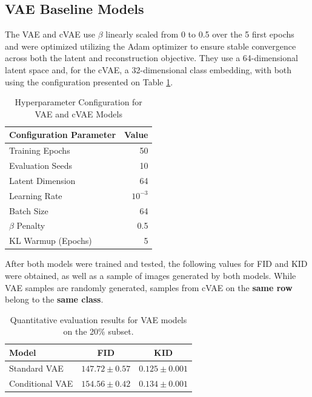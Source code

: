 \documentclass[runningheads]{llncs}
\begin{document}
\subsection{VAE Baseline Models}

The VAE and cVAE use $\beta$ linearly scaled from 0 to 0.5 over the 5 first epochs and were optimized utilizing the Adam optimizer to ensure stable convergence across both the latent and reconstruction objective. They use a 64-dimensional latent space and, for the cVAE, a 32-dimensional class embedding, with both using the configuration presented on Table \ref{tab:vae_hyperparams}.

\begin{table}[H]
\centering
\caption{Hyperparameter Configuration for VAE and cVAE Models}
\label{tab:vae_hyperparams}
\begin{tabular}{lr}
\hline
\textbf{Configuration Parameter} & \textbf{Value} \\
\hline
Training Epochs & 50 \\
Evaluation Seeds & 10 \\
Latent Dimension & 64 \\
Learning Rate & $10^{-3}$ \\
Batch Size & 64 \\
$\beta$ Penalty & 0.5 \\
KL Warmup (Epochs) & 5 \\
\hline
\end{tabular}
\end{table}

\noindent
After both models were trained and tested, the following values for FID and KID were obtained, as well as a sample of images generated by both models. While VAE samples are randomly generated, samples from cVAE on the \textbf{same row} belong to the \textbf{same class}.  
\begin{table}[H]
\centering
\caption{Quantitative evaluation results for VAE models on the 20\% subset.}
\label{tab:vae_evaluation}
\begin{tabular}{lcc}
\hline
\textbf{Model} & \textbf{FID} & \textbf{KID} \\
\hline
Standard VAE & $147.72 \pm 0.57$ & $0.125 \pm 0.001$ \\
Conditional VAE & $154.56 \pm 0.42$ & $0.134 \pm 0.001$ \\
\hline
\end{tabular}
\end{table}
\end{document}
